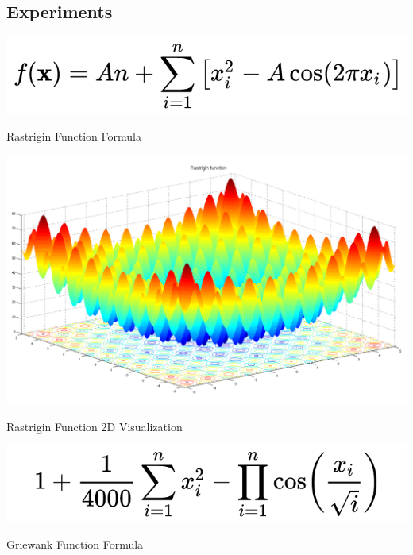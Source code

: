 \documentclass[a0,portrait,25pt]{sciposter}
\begin{document}
\begin{multicols}{3}

\begin{mdframed}[backgroundcolor=white,roundcorner=4pt,shadow=true,linewidth=1pt] \color{Black}

\section*{Experiments}

\begin{minipage}[c]{1\linewidth}
\includegraphics[width=0.9\linewidth]{fig01a}
\caption{Rastrigin Function Formula}
\end{minipage}

\begin{minipage}[c]{1\linewidth}
\includegraphics[width=0.9\linewidth]{fig01b}
\caption{Rastrigin Function 2D Visualization}
\end{minipage}

\begin{minipage}[c]{1\linewidth}
\includegraphics[width=0.9\linewidth]{fig02a}
\caption{Griewank Function Formula}
\end{minipage}


\end{mdframed}
\end{multicols}
\end{document}
